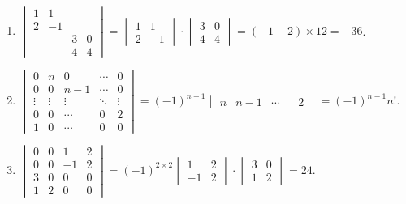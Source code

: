 	\paragraph{} %
		\begin{enumerate}
			\item %
			      $\begin{vmatrix}
					      1 & 1  &   &   \\
					      2 & -1 &   &   \\
					        &    & 3 & 0 \\
					        &    & 4 & 4
				      \end{vmatrix} = \begin{vmatrix}
					      1 & 1  \\
					      2 & -1
				      \end{vmatrix} \cdot \begin{vmatrix}
					      3 & 0 \\
					      4 & 4
				      \end{vmatrix} = (-1-2) \times 12 = -36$.

			\item %
			      $\begin{vmatrix}
					      0      & n      & 0      & \cdots & 0      \\
					      0      & 0      & n-1    & \cdots & 0      \\
					      \vdots & \vdots & \vdots & \ddots & \vdots \\
					      0      & 0      & \cdots & 0      & 2      \\
					      1      & 0      & \cdots & 0      & 0
				      \end{vmatrix} = (-1)^{n-1} \begin{vmatrix}
					      n & n-1 & \cdots &  & 2
				      \end{vmatrix} = (-1)^{n-1}n!$.

			\item %
			      $\begin{vmatrix}
					      0 & 0 & 1  & 2 \\
					      0 & 0 & -1 & 2 \\
					      3 & 0 & 0  & 0 \\
					      1 & 2 & 0  & 0
				      \end{vmatrix} = (-1)^{2 \times 2} \begin{vmatrix}
					      1  & 2 \\
					      -1 & 2
				      \end{vmatrix} \cdot \begin{vmatrix}
					      3 & 0 \\
					      1 & 2
				      \end{vmatrix} = 24$.
		\end{enumerate}


